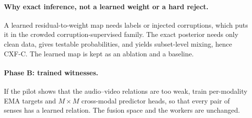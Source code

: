 \documentclass[10pt,twocolumn]{article}
\begin{document}
\paragraph{Why exact inference, not a learned weight or a hard reject.} A learned residual-to-weight map needs labels or injected
corruptions, which puts it in the crowded corruption-supervised family. The exact posterior needs only clean data,
gives testable probabilities, and yields subset-level mixing, hence CXF-C. The learned map is kept as an ablation
and a baseline.

\paragraph{Phase B: trained witnesses.} If the pilot shows that the audio--video relations are too weak, train
per-modality EMA targets and $M\times M$ cross-modal predictor heads, so that every pair of senses has a learned
relation. The fusion space and the workers are unchanged.
\end{document}

